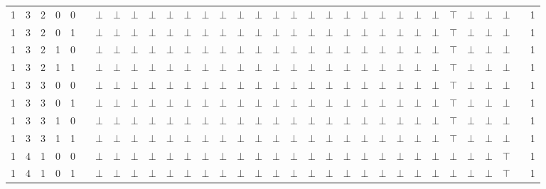 \documentclass[12pt]{extarticle}
\begin{document}
\begin{landscape}
\begin{tiny}
\begin{longtable}[c]{llllllllllllllllllllllllllllllll}
1 & 3 & 2 & 0 & 0 &  & $\bot$ & $\bot$ & $\bot$ & $\bot$ & $\bot$ & $\bot$ & $\bot$ & $\bot$ & $\bot$ & $\bot$ & $\bot$ & $\bot$ & $\bot$ & $\bot$ & $\bot$ & $\bot$ & $\bot$ & $\bot$ & $\bot$ & $\bot$ & $\top$ & $\bot$ & $\bot$ & $\bot$ &  & 1 \\
1 & 3 & 2 & 0 & 1 &  & $\bot$ & $\bot$ & $\bot$ & $\bot$ & $\bot$ & $\bot$ & $\bot$ & $\bot$ & $\bot$ & $\bot$ & $\bot$ & $\bot$ & $\bot$ & $\bot$ & $\bot$ & $\bot$ & $\bot$ & $\bot$ & $\bot$ & $\bot$ & $\top$ & $\bot$ & $\bot$ & $\bot$ &  & 1 \\
1 & 3 & 2 & 1 & 0 &  & $\bot$ & $\bot$ & $\bot$ & $\bot$ & $\bot$ & $\bot$ & $\bot$ & $\bot$ & $\bot$ & $\bot$ & $\bot$ & $\bot$ & $\bot$ & $\bot$ & $\bot$ & $\bot$ & $\bot$ & $\bot$ & $\bot$ & $\bot$ & $\top$ & $\bot$ & $\bot$ & $\bot$ &  & 1 \\
1 & 3 & 2 & 1 & 1 &  & $\bot$ & $\bot$ & $\bot$ & $\bot$ & $\bot$ & $\bot$ & $\bot$ & $\bot$ & $\bot$ & $\bot$ & $\bot$ & $\bot$ & $\bot$ & $\bot$ & $\bot$ & $\bot$ & $\bot$ & $\bot$ & $\bot$ & $\bot$ & $\top$ & $\bot$ & $\bot$ & $\bot$ &  & 1 \\
1 & 3 & 3 & 0 & 0 &  & $\bot$ & $\bot$ & $\bot$ & $\bot$ & $\bot$ & $\bot$ & $\bot$ & $\bot$ & $\bot$ & $\bot$ & $\bot$ & $\bot$ & $\bot$ & $\bot$ & $\bot$ & $\bot$ & $\bot$ & $\bot$ & $\bot$ & $\bot$ & $\top$ & $\bot$ & $\bot$ & $\bot$ &  & 1 \\
1 & 3 & 3 & 0 & 1 &  & $\bot$ & $\bot$ & $\bot$ & $\bot$ & $\bot$ & $\bot$ & $\bot$ & $\bot$ & $\bot$ & $\bot$ & $\bot$ & $\bot$ & $\bot$ & $\bot$ & $\bot$ & $\bot$ & $\bot$ & $\bot$ & $\bot$ & $\bot$ & $\top$ & $\bot$ & $\bot$ & $\bot$ &  & 1 \\
1 & 3 & 3 & 1 & 0 &  & $\bot$ & $\bot$ & $\bot$ & $\bot$ & $\bot$ & $\bot$ & $\bot$ & $\bot$ & $\bot$ & $\bot$ & $\bot$ & $\bot$ & $\bot$ & $\bot$ & $\bot$ & $\bot$ & $\bot$ & $\bot$ & $\bot$ & $\bot$ & $\top$ & $\bot$ & $\bot$ & $\bot$ &  & 1 \\
1 & 3 & 3 & 1 & 1 &  & $\bot$ & $\bot$ & $\bot$ & $\bot$ & $\bot$ & $\bot$ & $\bot$ & $\bot$ & $\bot$ & $\bot$ & $\bot$ & $\bot$ & $\bot$ & $\bot$ & $\bot$ & $\bot$ & $\bot$ & $\bot$ & $\bot$ & $\bot$ & $\top$ & $\bot$ & $\bot$ & $\bot$ &  & 1 \\
1 & 4 & 1 & 0 & 0 &  & $\bot$ & $\bot$ & $\bot$ & $\bot$ & $\bot$ & $\bot$ & $\bot$ & $\bot$ & $\bot$ & $\bot$ & $\bot$ & $\bot$ & $\bot$ & $\bot$ & $\bot$ & $\bot$ & $\bot$ & $\bot$ & $\bot$ & $\bot$ & $\bot$ & $\bot$ & $\bot$ & $\top$ &  & 1 \\
1 & 4 & 1 & 0 & 1 &  & $\bot$ & $\bot$ & $\bot$ & $\bot$ & $\bot$ & $\bot$ & $\bot$ & $\bot$ & $\bot$ & $\bot$ & $\bot$ & $\bot$ & $\bot$ & $\bot$ & $\bot$ & $\bot$ & $\bot$ & $\bot$ & $\bot$ & $\bot$ & $\bot$ & $\bot$ & $\bot$ & $\top$ &  & 1 \\

\end{longtable}
\end{tiny}
\end{landscape}
\end{document}
